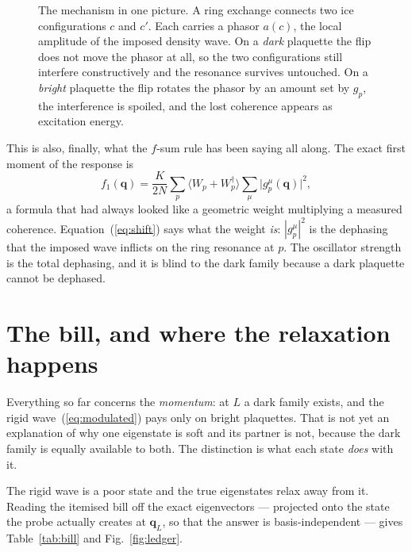 \documentclass[11pt]{article}
\newcommand{\bq}{\bm q}
\newcommand{\Wp}{W_p}
\newcommand{\Wpd}{W_p^{\dagger}}
\begin{document}
\begin{figure}[h]
\begin{tikzpicture}[scale=1.0,
  cfg/.style={draw=gray!60,rounded corners=2pt,minimum width=1.25cm,
              minimum height=0.72cm,font=\small,fill=gray!6}]
\end{tikzpicture}
\caption{The mechanism in one picture. A ring exchange connects two ice
configurations $c$ and $c'$. Each carries a phasor $a(c)$, the local
amplitude of the imposed density wave. On a \emph{dark} plaquette the
flip does not move the phasor at all, so the two configurations still
interfere constructively and the resonance survives untouched. On a
\emph{bright} plaquette the flip rotates the phasor by an amount set by
$g_p$, the interference is spoiled, and the lost coherence appears as
excitation energy.}
\label{fig:dephase}
\end{figure}

\noindent
This is also, finally, what the $f$-sum rule has been saying all along.
The exact first moment of the response is
\begin{equation}
f_1(\bq)=\frac{K}{2N}\sum_p\bigl\langle \Wp+\Wpd\bigr\rangle
\sum_\mu\bigl|g^\mu_p(\bq)\bigr|^2 ,
\label{eq:f1}
\end{equation}
a formula that had always looked like a geometric weight multiplying a
measured coherence. Equation~(\ref{eq:shift}) says what the weight
\emph{is}: $|g^\mu_p|^2$ is the dephasing that the imposed wave inflicts
on the ring resonance at $p$. The oscillator strength is the total
dephasing, and it is blind to the dark family because a dark plaquette
cannot be dephased.

\section{The bill, and where the relaxation happens}
\label{sec:state}

Everything so far concerns the \emph{momentum}: at $L$ a dark family
exists, and the rigid wave~(\ref{eq:modulated}) pays only on bright
plaquettes. That is not yet an explanation of why one eigenstate is soft
and its partner is not, because the dark family is equally available to
both. The distinction is what each state \emph{does} with it.

The rigid wave is a poor state and the true eigenstates relax away from
it. Reading the itemised bill off the exact eigenvectors --- projected
onto the state the probe actually creates at $\bq_L$, so that the answer
is basis-independent --- gives Table~\ref{tab:bill} and
Fig.~\ref{fig:ledger}.
\end{document}

